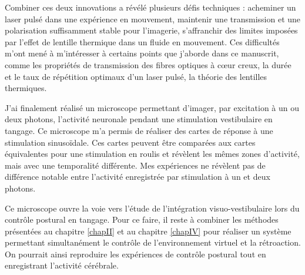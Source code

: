 Combiner ces deux innovations a révélé plusieurs défis techniques : acheminer un laser pulsé dans une expérience en mouvement, maintenir une transmission et une polarisation suffisamment stable pour l'imagerie, s'affranchir des limites imposées par l'effet de lentille thermique dans un fluide en mouvement. Ces difficultés m'ont mené à m'intéresser à certains points que j'aborde dans ce manuscrit, comme les propriétés de transmission des fibres optiques à cœur creux, la durée et le taux de répétition optimaux d'un laser pulsé, la théorie des lentilles thermiques. 

J'ai finalement réalisé un microscope permettant d'imager, par excitation à un ou deux photons, l'activité neuronale pendant une stimulation vestibulaire en tangage. Ce microscope m'a permis de réaliser des cartes de réponse à une stimulation sinusoïdale. Ces cartes peuvent être comparées aux cartes équivalentes pour une stimulation en roulis et révèlent les mêmes zones d'activité, mais avec une temporalité différente. Mes expériences ne révèlent pas de différence notable entre l'activité enregistrée par stimulation à un et deux photons.

Ce microscope ouvre la voie vers l'étude de l'intégration visuo-vestibulaire lors du contrôle postural en tangage. Pour ce faire, il reste à combiner les méthodes présentées au chapitre \ref{chapII} et au chapitre \ref{chapIV} pour réaliser un système permettant simultanément le contrôle de l'environnement virtuel et la rétroaction. On pourrait ainsi reproduire les expériences de contrôle postural tout en enregistrant l'activité cérébrale.